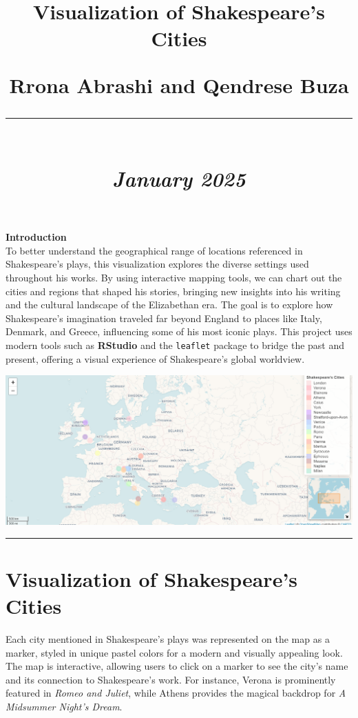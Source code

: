 \documentclass[a4paper,12pt]{article}
\title{
    \vspace{0cm} 
    \begin{flushleft} 
    \textbf{\huge \sffamily Visualization of Shakespeare's Cities} \\[0.5cm] 
    \end{flushleft}
    \LARGE \textbf{Rrona Abrashi and Qendrese Buza } \\[1cm]
    \textcolor{shakespeareyellow}{\rule{0.8\linewidth}{0.5mm}} \\[1cm]
    \large \textit{January 2025} 
    \vspace{1cm}
}
\author{}
\date{}
\begin{document}
\maketitle

\noindent
\textbf{\huge \color{shakespeareblue} Introduction} \\[0.5cm]
To better understand the geographical range of locations referenced in Shakespeare’s plays, this visualization explores the diverse settings used throughout his works. By using interactive mapping tools, we can chart out the cities and regions that shaped his stories, bringing new insights into his writing and the cultural landscape of the Elizabethan era. The goal is to explore how Shakespeare’s imagination traveled far beyond England to places like Italy, Denmark, and Greece, influencing some of his most iconic plays. This project uses modern tools such as \textbf{RStudio} and the \texttt{leaflet} package to bridge the past and present, offering a visual experience of Shakespeare’s global worldview.

\vspace{1cm}

\begin{center}
    \includegraphics[width=0.8\linewidth]{RStudioMap.png} \\[0.5cm] 
    \textcolor{shakespeareyellow}{\rule{0.8\linewidth}{0.5mm}} 
\end{center}

\vspace{1cm}

\newpage

\section*{\color{shakespeareblue}Visualization of Shakespeare's Cities}
Each city mentioned in Shakespeare's plays was represented on the map as a marker, styled in unique pastel colors for a modern and visually appealing look. The map is interactive, allowing users to click on a marker to see the city's name and its connection to Shakespeare's work. For instance, Verona is prominently featured in \textit{Romeo and Juliet}, while Athens provides the magical backdrop for \textit{A Midsummer Night’s Dream}.
\end{document}
